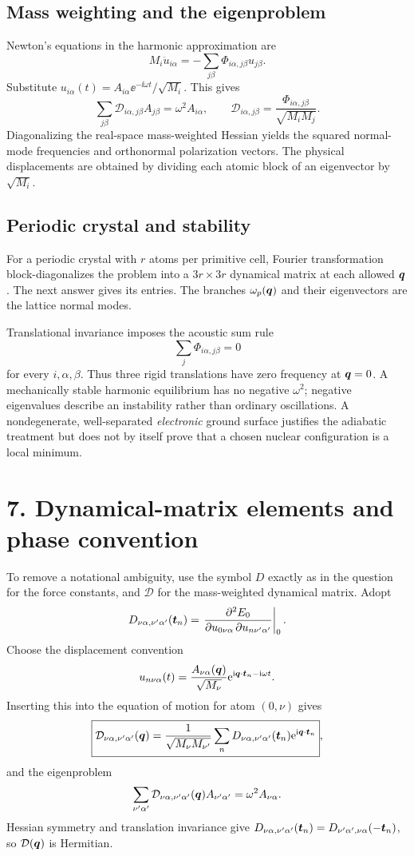 \subsection*{Mass weighting and the eigenproblem}
Newton's equations in the harmonic approximation are
\[
M_i\ddot u_{i\alpha}=-\sum_{j\beta}\Phi_{i\alpha,j\beta}u_{j\beta}.
\]
Substitute $u_{i\alpha}(t)=A_{i\alpha}\ee^{-\ii\omega t}/\sqrt{M_i}$. This gives
\[
\sum_{j\beta}\mathcal D_{i\alpha,j\beta}A_{j\beta}=\omega^2 A_{i\alpha},
\qquad
\boxed{\mathcal D_{i\alpha,j\beta}
=\frac{\Phi_{i\alpha,j\beta}}{\sqrt{M_iM_j}}}.
\]
Diagonalizing the real-space mass-weighted Hessian yields the squared normal-mode frequencies and orthonormal polarization vectors. The physical displacements are obtained by dividing each atomic block of an eigenvector by $\sqrt{M_i}$.

\subsection*{Periodic crystal and stability}
For a periodic crystal with $r$ atoms per primitive cell, Fourier transformation block-diagonalizes the problem into a $3r\times3r$ dynamical matrix at each allowed $\boldsymbol{q}$. The next answer gives its entries. The branches $\omega_p(\boldsymbol{q})$ and their eigenvectors are the lattice normal modes.

Translational invariance imposes the acoustic sum rule
\[
\sum_j\Phi_{i\alpha,j\beta}=0
\]
for every $i,\alpha,\beta$. Thus three rigid translations have zero frequency at $\boldsymbol{q}=0$. A mechanically stable harmonic equilibrium has no negative $\omega^2$; negative eigenvalues describe an instability rather than ordinary oscillations. A nondegenerate, well-separated \emph{electronic} ground surface justifies the adiabatic treatment but does not by itself prove that a chosen nuclear configuration is a local minimum.

\section*{7. Dynamical-matrix elements and phase convention}
To remove a notational ambiguity, use the symbol $D$ exactly as in the question for the force constants, and $\mathcal D$ for the mass-weighted dynamical matrix. Adopt
\[
D_{\nu\alpha,\nu'\alpha'}(\boldsymbol{t}_n)
=\left.\frac{\partial^2E_0}
{\partial u_{0\nu\alpha}\,\partial u_{n\nu'\alpha'}}\right|_0.
\]
Choose the displacement convention
\[
u_{n\nu\alpha}(t)=\frac{A_{\nu\alpha}(\boldsymbol{q})}{\sqrt{M_\nu}}
\mathrm{e}^{\mathrm{i}\boldsymbol{q}\cdot\boldsymbol{t}_n-\mathrm{i}\omega t}.
\]
Inserting this into the equation of motion for atom $(0,\nu)$ gives
\[
\boxed{\mathcal D_{\nu\alpha,\nu'\alpha'}(\boldsymbol{q})
=\frac1{\sqrt{M_\nu M_{\nu'}}}
\sum_n D_{\nu\alpha,\nu'\alpha'}(\boldsymbol{t}_n)
\mathrm{e}^{\mathrm{i}\boldsymbol{q}\cdot\boldsymbol{t}_n}},
\]
and the eigenproblem
\[
\sum_{\nu'\alpha'}\mathcal D_{\nu\alpha,\nu'\alpha'}(\boldsymbol{q})
A_{\nu'\alpha'}=\omega^2 A_{\nu\alpha}.
\]
Hessian symmetry and translation invariance give
$D_{\nu\alpha,\nu'\alpha'}(\boldsymbol{t}_n)
=D_{\nu'\alpha',\nu\alpha}(-\boldsymbol{t}_n)$, so $\mathcal D(\boldsymbol{q})$ is Hermitian.

